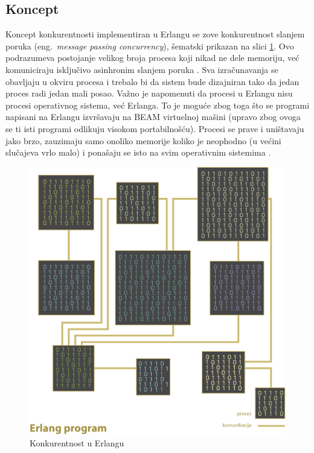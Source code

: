\documentclass[a4paper]{article}
\begin{document}
\subsection{Koncept}
Koncept konkurentnosti implementiran u Erlangu se zove konkurentnost slanjem poruka (eng.~{\em message passing concurrency}), šematski prikazan na slici \ref{fig:concurrency}. Ovo podrazumeva postojanje velikog broja procesa koji nikad ne dele memoriju, već komuniciraju isključivo asinhronim slanjem poruka \cite{book_joe}.
Sva izračunavanja se obavljaju u okviru procesa i trebalo bi da sistem bude dizajniran tako da jedan proces radi jedan mali posao.
Važno je napomenuti da procesi u Erlangu nisu procesi operativnog sistema, već Erlanga.
To je moguće zbog toga što se programi napisani na Erlangu izvršavaju na BEAM virtuelnoj mašini (upravo zbog ovoga se ti isti programi odlikuju visokom portabilnošću).
Procesi se prave i uništavaju jako brzo, zauzimaju samo onoliko memorije koliko je neophodno (u većini slučajeva vrlo malo)
i ponašaju se isto na svim operativnim sistemima \cite{book_joe}.

\begin{figure}[h!]
\begin{center}
\includegraphics[scale=0.5]{concurrency.png}
\end{center}
\caption{Konkurentnost u Erlangu}
\label{fig:concurrency}
\end{figure} 
\end{document}
